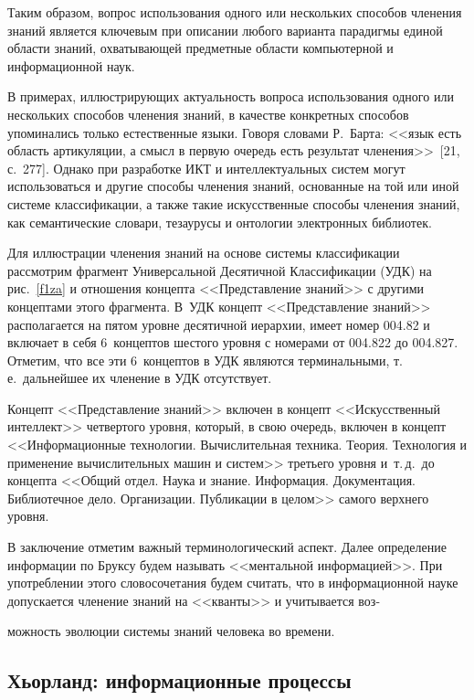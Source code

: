 \begin{multicols}{2}
      Таким образом, вопрос использования одного или нескольких способов членения знаний
является ключевым при описании любого варианта парадигмы единой области знаний,
охватывающей предметные области компьютерной и информационной наук.

      В примерах, иллюстрирующих актуальность вопроса использования одного или
нескольких способов членения знаний, в качестве конкретных способов упоминались только
естественные языки.
Говоря словами Р.~Барта: <<язык есть область артикуляции, а смысл в
первую очередь есть результат членения>>~[21, с.~277]. Однако при разработке
ИКТ и интеллектуальных систем могут использоваться и другие способы членения знаний,
основанные на той или иной системе классификации, а также такие искусственные способы
членения знаний, как семантические словари, тезаурусы и онтологии электронных библиотек.


      Для иллюстрации членения знаний на основе системы классификации рассмотрим
фрагмент Универсальной Десятичной Классификации (УДК) на рис.~\ref{f1za} и отношения
концепта <<Представление знаний>> с другими концептами этого фрагмента. В~УДК концепт
<<Представление знаний>> располагается на пятом уровне десятичной иерархии, имеет номер
004.82 и включает в себя 6~концептов шестого уровня с номерами от 004.822 до 004.827.
Отметим, что все эти 6~концептов в УДК являются терминальными, т.\,е.\ дальнейшее их
членение в УДК отсутствует.

      Концепт <<Представление знаний>> включен в концепт <<Искусственный интеллект>>
четвертого уровня, который, в свою очередь, включен в концепт <<Информационные
технологии. Вычислительная техника. Теория. Технология и применение вычислительных
машин и систем>> третьего уровня и~т.\,д.\ до концепта <<Общий отдел. Наука и знание.
Информация. Документация. Библиотечное дело. Организации. Публикации в целом>> самого
верхнего уровня.

      В заключение отметим важный терминологический аспект. Далее определение
информации по Бруксу будем называть <<ментальной информацией>>. При употреблении этого
словосочетания будем считать, что в информационной науке допускается членение знаний на
<<кванты>> и учитывается воз-\linebreak\vspace*{-12pt}
\pagebreak

\noindent
можность эволюции системы знаний человека во времени.

\subsection{Хьорланд: информационные процессы} %


\end{multicols}
